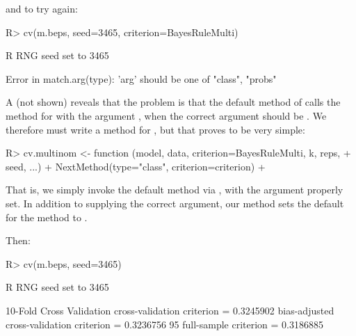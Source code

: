 \documentclass[
]{jss}
\begin{document}
and to try again:

\begin{CodeChunk}
\begin{CodeInput}
R> cv(m.beps, seed=3465, criterion=BayesRuleMulti)
\end{CodeInput}
\begin{CodeOutput}
R RNG seed set to 3465
\end{CodeOutput}
\begin{CodeOutput}
Error in match.arg(type): 'arg' should be one of "class", "probs"
\end{CodeOutput}
\end{CodeChunk}

A  (not shown) reveals that the problem is that the
default method of  calls the  method for
 with the argument , when the
correct argument should be . We therefore must write
a  method for , but that proves to be very
simple:

\begin{CodeChunk}
\begin{CodeInput}
R> cv.multinom <- function (model, data, criterion=BayesRuleMulti, k, reps,
+                          seed, ...){
+   NextMethod(type="class", criterion=criterion)
+ }
\end{CodeInput}
\end{CodeChunk}

That is, we simply invoke the default  method via
, with the  argument properly set. In
addition to supplying the correct  argument, our method sets
the default  for the  method to
.

Then:

\begin{CodeChunk}
\begin{CodeInput}
R> cv(m.beps, seed=3465)
\end{CodeInput}
\begin{CodeOutput}
R RNG seed set to 3465
\end{CodeOutput}
\begin{CodeOutput}
10-Fold Cross Validation
cross-validation criterion = 0.3245902
bias-adjusted cross-validation criterion = 0.3236756
95%
full-sample criterion = 0.3186885 
\end{CodeOutput}
\end{CodeChunk}
\end{document}
